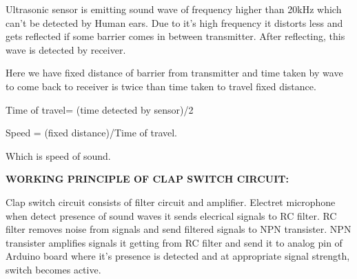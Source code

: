 \documentclass[12pt]{article}
\begin{document}
\vspace{\baselineskip}
{\fontsize{14pt}{16.8pt}\selectfont Ultrasonic sensor is emitting sound wave of frequency higher than 20kHz which can’t be detected by Human ears. Due to it’s high frequency it distorts less and gets reflected if some barrier comes in between transmitter. After reflecting, this wave is detected by receiver.\par}\par

\vspace{\baselineskip}
{\fontsize{14pt}{16.8pt}\selectfont Here we have fixed distance of barrier from transmitter and time taken by wave to come back to receiver is twice than time taken to travel fixed distance.\par}\par

\vspace{\baselineskip}
{\fontsize{14pt}{16.8pt}\selectfont Time of travel= (time detected by sensor)/2\par}\par

\vspace{\baselineskip}
{\fontsize{14pt}{16.8pt}\selectfont Speed = (fixed distance)/Time of travel.\par}\par

\vspace{\baselineskip}
{\fontsize{14pt}{16.8pt}\selectfont  Which is speed of sound.\par}\par

\vspace{\baselineskip}
{\fontsize{14pt}{16.8pt}\selectfont \textbf {WORKING PRINCIPLE OF CLAP SWITCH CIRCUIT:}\par}\par 

\vspace{\baselineskip}
{\fontsize{14pt}{16.8pt}\selectfont  Clap switch circuit consists of filter circuit and amplifier. Electret microphone when detect presence of sound waves it sends elecrical signals to RC filter. RC filter removes noise from signals and send filtered signals to NPN transister. NPN transister amplifies signals it getting from RC filter and send it to analog pin of Arduino board where it's presence is detected and at appropriate signal strength, switch becomes active.\par}\par  
\end{document}
